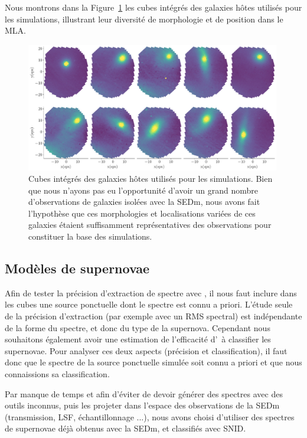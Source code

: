 \documentclass[../main/main.tex]{subfiles}
\begin{document}
Nous montrons dans la Figure~\ref{fig:allhostsimu} les cubes intégrés
des galaxies hôtes utilisés pour les simulations, illustrant leur
diversité de morphologie et de position dans le MLA.
\begin{figure}[ht]
  \centering
  \includegraphics[width=0.99\textwidth]{../figures/08_simu/allhostsimu.pdf}
  \caption[Cubes de galaxies hôtes utilisés pour les simulations.]{Cubes
    intégrés des galaxies hôtes utilisés pour les simulations. Bien que
    nous n'ayons pas eu l'opportunité d'avoir un grand nombre
    d'observations de galaxies isolées avec la SEDm, nous avons fait
    l'hypothèse que ces morphologies et localisations variées de ces
    galaxies étaient suffisamment représentatives des observations pour
    constituer la base des simulations.}
  \label{fig:allhostsimu}
\end{figure}

\subsection{Modèles de supernovae}

Afin de tester la précision d'extraction de spectre avec \hypergal, il nous faut inclure dans les cubes une source ponctuelle dont le
spectre est connu a priori. L'étude seule de la précision d'extraction
(par exemple avec un RMS spectral) est indépendante de la forme du spectre, et donc du type
de la supernova.
Cependant nous souhaitons également avoir une
estimation de l'efficacité d'\hypergal\ à classifier les supernovae.
Pour analyser ces deux aspects (précision et classification), il faut
donc que le spectre de la source ponctuelle simulée soit connu a priori et que nous connaissions sa classification.

Par manque de temps et afin d'éviter de devoir générer des spectres avec
des outils inconnus, puis les projeter dans l'espace des observations de
la SEDm (transmission, LSF, échantillonnage ...), nous avons choisi
d'utiliser des spectres de supernovae déjà obtenus avec la SEDm, et
classifiés avec SNID.
\end{document}
